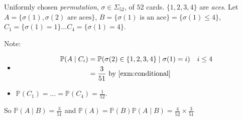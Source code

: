 \begin{example}
    Uniformly chosen \emph{permutation}, $\sigma \in \Sigma_{52}$, of $52$ cards.
    $\{1, 2, 3, 4\}$ are \emph{aces}.
    Let $A = \{\sigma(1), \sigma(2) \text{ are aces}\}$, $B = \{\sigma(1) \text{ is an ace}\} = \{\sigma(1) \leq 4\}$, $C_1 = \{\sigma(1) = 1\} \dots C_4 = \{\sigma(1) = 4\}$.

    Note:
    \begin{itemize}
        \item \begin{align*}
            \mathbb{P}(A \mid C_i) &= \mathbb{P}(\sigma(2) \in \{1, 2, 3, 4\} \mid \sigma(1) = i) \quad i \leq 4 \\
            &= \frac{3}{51} \text{ by \Cref{exm:conditional}}
        \end{align*} 
        \item $\mathbb{P}(C_1) = \dots = \mathbb{P}(C_4) = \frac{1}{52}$.
    \end{itemize} 
    So $\mathbb{P}(A \mid B) = \frac{3}{51}$ and $\mathbb{P}(A) = \mathbb{P}(B) \mathbb{P}(A \mid B) = \frac{4}{52} \times \frac{3}{51}$
\end{example}